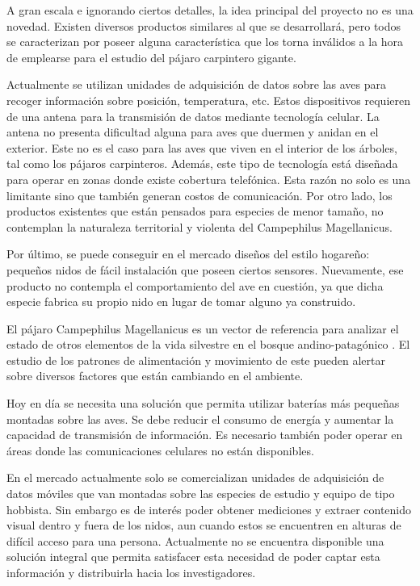 %

%


A gran escala e ignorando ciertos detalles, la idea principal del proyecto no es una novedad. Existen diversos productos similares al que se desarrollará, pero todos se caracterizan por poseer alguna característica que los torna inválidos a la hora de emplearse para el estudio del pájaro carpintero gigante.

Actualmente se utilizan unidades de adquisición de datos sobre las aves para recoger información sobre posición, temperatura, etc. Estos dispositivos requieren de una antena para la transmisión de datos mediante tecnología celular. La antena no presenta dificultad alguna para aves que duermen y anidan en el exterior. Este no es el caso para las aves que viven en el interior de los árboles, tal como los pájaros carpinteros. Además, este tipo de tecnología está diseñada para operar en zonas donde existe cobertura telefónica. Esta razón no solo es una limitante sino que también generan costos de comunicación. Por otro lado, los productos existentes que están pensados para especies de menor tamaño, no contemplan la naturaleza territorial y violenta del Campephilus Magellanicus.

Por último, se puede conseguir en el mercado diseños del estilo hogareño: pequeños nidos de fácil instalación que poseen ciertos sensores. Nuevamente, ese producto no contempla el comportamiento del ave en cuestión, ya que dicha especie fabrica su propio nido en lugar de tomar alguno ya construido.


El pájaro Campephilus Magellanicus es un vector de referencia para analizar el estado de otros elementos de la vida silvestre en el bosque andino-patagónico \cite{ref:PaperValeriaOjeda}. El estudio de los patrones de alimentación y movimiento de este pueden alertar sobre diversos factores que están cambiando en el ambiente.

Hoy en día se necesita una solución que permita utilizar baterías más pequeñas montadas sobre las aves. Se debe reducir el consumo de energía y aumentar la capacidad de transmisión de información. Es necesario también poder operar en áreas donde las comunicaciones celulares no están disponibles.

En el mercado actualmente solo se comercializan unidades de adquisición de datos móviles que van montadas sobre las especies de estudio y equipo de tipo hobbista. Sin embargo es de interés poder obtener mediciones y extraer contenido visual dentro y fuera de los nidos, aun cuando estos se encuentren en alturas de difícil acceso para una persona. Actualmente no se encuentra disponible una solución integral que permita satisfacer esta necesidad de poder captar esta información y distribuirla hacia los investigadores.

%
